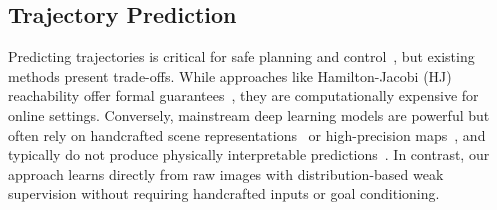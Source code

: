 \documentclass[nonacm,sigconf]{acmart}
\begin{document}
\subsection{Trajectory Prediction}



Predicting trajectories is critical for safe planning and control~\cite[]{fridovich2020confidence}, but existing methods present trade-offs. While approaches like Hamilton-Jacobi (HJ) reachability offer formal guarantees~\cite[]{li2021prediction,nakamura2023online}, they are computationally expensive for online settings. Conversely, mainstream deep learning models are powerful but often rely on handcrafted scene representations~\cite[]{salzmann2020trajectron++} or high-precision maps~\cite[]{itkina2023interpretable, hsu2023interpretable}, and typically do not produce physically interpretable predictions~\cite[]{lu2024towards, lindemann2023conformal, ruchkin2022confidence}. In contrast, our approach learns directly from raw images with distribution-based weak supervision without requiring handcrafted inputs or goal conditioning.
\end{document}
